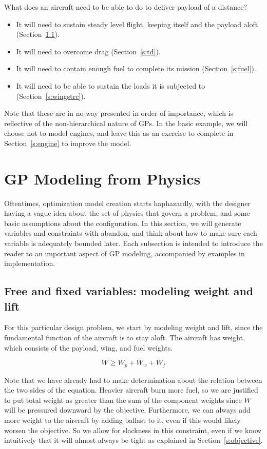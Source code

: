 What does an aircraft need to be able to do to deliver payload of a distance?
\begin{itemize}
	\item It will need to sustain steady
    level flight, keeping itself and the payload aloft (Section~\ref{s:wl}).
    \item It will need to overcome drag (Section~\ref{s:td}).
	\item It will need to contain enough fuel to complete its mission
        (Section~\ref{s:fuel}).
	\item It will need to be able to sustain the loads it is
    subjected to (Section~\ref{s:wingstrc}).
\end{itemize}

Note that these are in no way presented in order of importance, which is reflective
of the non-hierarchical nature of \gls{GP}s.
In the basic example, we will choose not to model engines,
and leave this as an exercise
to complete in Section~\ref{s:engine} to improve the model.

\section{GP Modeling from Physics}

Oftentimes, optimization model creation starts haphazardly, with the designer having a
vague idea about the set of physics that govern a problem, and some basic
assumptions about the configuration. In this section, we will
generate variables and constraints with abandon, and think about how to make
sure each variable is adequately bounded later. Each subsection is intended
to introduce the reader to an important aspect of \gls{GP} modeling,
accompanied by examples in implementation.

\subsection{Free and fixed variables: modeling weight and lift}
\label{s:wl}

For this particular design problem, we start by modeling
weight and lift, since the fundamental function of the aircraft is to stay aloft.
The aircraft has weight, which consists of the payload, wing, and fuel weights. 

\begin{equation}
    W \geq W_p + W_w + W_f
\end{equation}

Note that we have already had to make determination about the relation between
the two sides of the equation. Heavier aircraft burn more fuel, so we are justified
to put total weight as greater than the sum of the component weights since
$W$ will be pressured downward by the objective. Furthermore, we can
always add more weight to the aircraft by adding ballast to it, even if this would likely
worsen the objective. So we allow for slackness in this constraint, even
if we know intuitively that it will almost always be tight as explained in Section~\ref{s:objective}.


